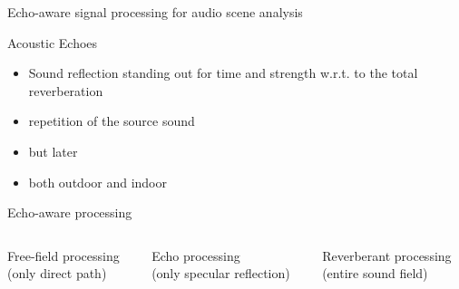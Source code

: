\begin{frame}[t]{\alert{Echo-aware signal processing for audio scene analysis}}

    \begin{mydefblock}{Acoustic Echoes}
        \begin{itemize}
            \item Sound reflection standing out for time and strength w.r.t. to the total reverberation
            \item repetition of the source sound
            \item but later
            \item both outdoor and indoor
        \end{itemize}
    \end{mydefblock}

    \vfill
    \begin{block}{Echo-aware processing}
    \end{block}

    \begin{columns}[T,onlytextwidth]
        \begin{column}{0.3\textwidth}
            \alert{Free-field} processing
            \\{\small(only direct path)}
        \end{column}\hfill
        \begin{column}{0.3\textwidth}
            \alert{Echo} processing
            \\{\small(only specular reflection)}
        \end{column}\hfill
        \begin{column}{0.3\textwidth}
            \alert{Reverberant} processing
            \\{\small(entire sound field)}
        \end{column}
    \end{columns}%


\end{frame}
